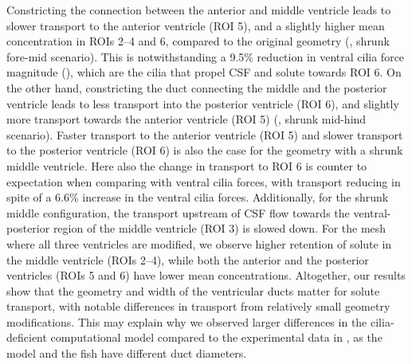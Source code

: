 \documentclass{WileyMSP-template}
\begin{document}
Constricting the connection between the anterior and middle ventricle leads to
slower transport to the anterior ventricle (ROI 5),
and a slightly higher mean concentration in ROIs 2--4 and 6, compared to the original geometry
(, shrunk fore-mid scenario). This is notwithstanding a
9.5\% reduction in ventral cilia force magnitude
(), which are the cilia that propel CSF and solute towards ROI 6.
On the other hand, constricting the duct connecting the middle and the posterior ventricle
leads to less transport into the posterior ventricle (ROI 6),
and slightly more transport towards the anterior ventricle (ROI 5)
(, shrunk mid-hind scenario).
Faster transport to the anterior ventricle (ROI 5) and slower transport to the
posterior ventricle (ROI 6) is also the case for the geometry with a
shrunk middle ventricle.
Here also the change in transport to ROI 6 is counter to expectation when comparing with
ventral cilia forces, with transport reducing in spite of a 6.6\% increase in the
ventral cilia forces.
Additionally, for the shrunk middle configuration, the transport upstream of CSF flow towards the
ventral-posterior region of the middle ventricle (ROI 3) is slowed down.
For the mesh where all three ventricles are modified,
we observe higher retention of solute in the middle ventricle (ROIs 2--4),
while both the anterior and the posterior ventricles (ROIs 5 and 6) have lower mean concentrations.
Altogether, our results show that the geometry and width of the ventricular ducts matter
for solute transport, with notable differences in transport from relatively small
geometry modifications. This may explain why we observed larger differences
in the cilia-deficient computational model compared to the experimental data in
, as the model and the fish have different duct diameters.
\end{document}
